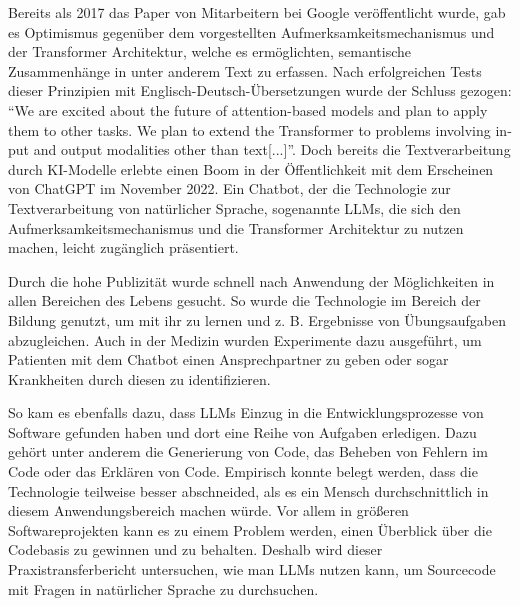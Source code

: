 \documentclass[../main.tex]{subfiles}
\begin{document}
Bereits als 2017 das Paper  von Mitarbeitern bei Google veröffentlicht wurde, gab es Optimismus gegenüber dem vorgestellten Aufmerksamkeitsmechanismus und der Transformer Architektur, welche es ermöglichten, semantische Zusammenhänge in unter anderem Text zu erfassen.
Nach erfolgreichen Tests dieser Prinzipien mit Englisch-Deutsch-Übersetzungen wurde der Schluss gezogen: \foreignquote{english}{We are excited about the future of attention-based models and plan to apply them to other tasks. We plan to extend the Transformer to problems involving input and output modalities other than text[...]}\cite*{vaswani2017attention}.
Doch bereits die Textverarbeitung durch KI-Modelle erlebte einen Boom in der Öffentlichkeit mit dem Erscheinen von ChatGPT im November 2022.
Ein Chatbot, der die Technologie zur Textverarbeitung von natürlicher Sprache, sogenannte \glspl{LLM}, die sich den Aufmerksamkeitsmechanismus und die Transformer Architektur zu nutzen machen, leicht zugänglich präsentiert. \cite{chatgpt2023}

Durch die hohe Publizität wurde schnell nach Anwendung der Möglichkeiten in allen Bereichen des Lebens gesucht.
So wurde die Technologie im Bereich der Bildung genutzt, um mit ihr zu lernen und z. B. Ergebnisse von Übungsaufgaben abzugleichen.
Auch in der Medizin wurden Experimente dazu ausgeführt, um Patienten mit dem Chatbot einen Ansprechpartner zu geben oder sogar Krankheiten durch diesen zu identifizieren.
\cite*{liu2023summary}

So kam es ebenfalls dazu, dass \glspl{LLM} Einzug in die Entwicklungsprozesse von Software gefunden haben und dort eine Reihe von Aufgaben erledigen.
Dazu gehört unter anderem die Generierung von Code, das Beheben von Fehlern im Code oder das Erklären von Code.
Empirisch konnte belegt werden, dass die Technologie teilweise besser abschneided, als es ein Mensch durchschnittlich in diesem Anwendungsbereich machen würde\cite*{tian2023chatgpt}.
Vor allem in größeren Softwareprojekten kann es zu einem Problem werden, einen Überblick über die Codebasis zu gewinnen und zu behalten.
Deshalb wird dieser Praxistransferbericht untersuchen, wie man \glspl{LLM} nutzen kann, um Sourcecode mit Fragen in natürlicher Sprache zu durchsuchen.
\end{document}

